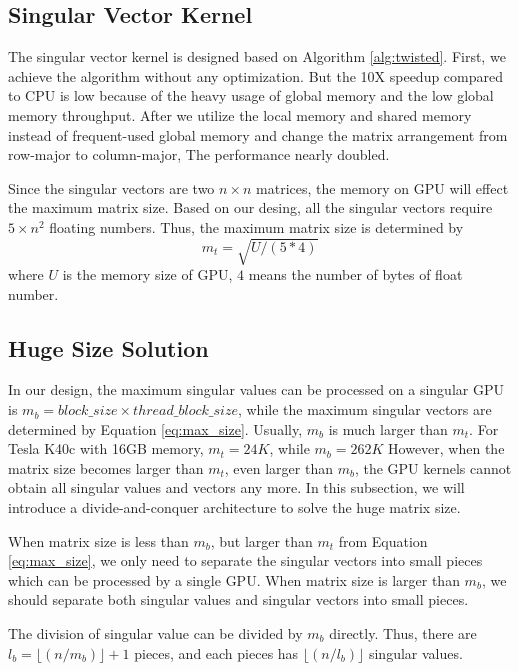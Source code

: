 \subsection{Singular Vector Kernel}
The singular vector kernel is designed based on Algorithm \ref{alg:twisted}.
First, we achieve the algorithm without any optimization.
But the 10X speedup compared to CPU is low because of the heavy usage of global memory and the low global memory throughput.
After we utilize the local memory and shared memory instead of frequent-used global memory and change the matrix arrangement from row-major to column-major,
The performance nearly doubled.

Since the singular vectors are two $n\times n$ matrices, the memory on GPU will effect the maximum matrix size.
Based on our desing, all the singular vectors require $5\times n^2$ floating numbers.
Thus, the maximum matrix size is determined by
\begin{equation}
m_t = \sqrt{U / (5 * 4)}
\label{eq:max_size}
\end{equation}
where $U$ is the memory size of GPU, $4$ means the number of bytes of float number.

\subsection{Huge Size Solution}
In our design, the maximum singular values can be processed on a singular GPU is $m_b = block\_size \times thread\_block\_size$,
while the maximum singular vectors are determined by Equation \ref{eq:max_size}.
Usually, $m_b$ is much larger than $m_t$.
For Tesla K40c with 16GB memory, $m_t = 24K$, while $m_b = 262K$
However, when the matrix size becomes larger than $m_t$, even larger than $m_b$,
the GPU kernels cannot obtain all singular values and vectors any more.
In this subsection, we will introduce a divide-and-conquer architecture to solve the huge matrix size.

When matrix size is less than $m_b$, but larger than $m_t$ from Equation \ref{eq:max_size},
we only need to separate the singular vectors into small pieces which can be processed by a single GPU.
When matrix size is larger than $m_b$, we should separate both singular values and singular vectors into small pieces.

The division of singular value can be divided by $m_b$ directly.
Thus, there are $l_b = \lfloor(n/m_b)\rfloor + 1$ pieces, and each pieces has $\lfloor(n/l_b)\rfloor$ singular values.

